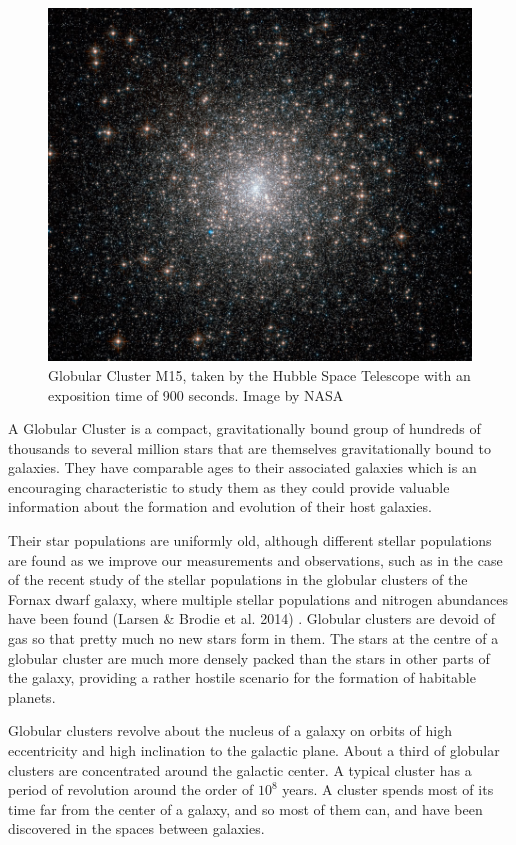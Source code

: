 \begin{figure}[H]
\centering
\includegraphics[width=12cm]{images/m15.jpg}
\caption[M15 Globular cluster]{Globular Cluster M15, taken by the Hubble Space Telescope with an exposition time of 900 seconds. Image by NASA}
\end{figure}

A Globular Cluster is a compact, gravitationally bound group of hundreds of thousands to several million stars that are themselves gravitationally bound to galaxies. They have comparable ages to their associated galaxies which is an encouraging characteristic to study them as they could provide valuable information about the formation and evolution of their host galaxies.

Their star populations are uniformly old, although different stellar populations are found as we improve our measurements and observations, such as in the case of the recent study of the stellar populations in the globular clusters of the Fornax dwarf galaxy, where multiple stellar populations and nitrogen abundances have been found (Larsen \& Brodie et al. 2014) \cite{15}. Globular clusters are devoid of gas so that pretty much no new stars form in them. The stars at the centre of a globular cluster are much more densely packed than the stars in other parts of the galaxy, providing a rather hostile scenario for the formation of habitable planets.

Globular clusters revolve about the nucleus of a galaxy on orbits of high eccentricity and high inclination to the galactic plane. About a third of globular clusters are concentrated around the galactic center. A typical cluster has a period of revolution around the order of $ 10^{8} $ years. A cluster spends most of its time far from the center of a galaxy, and so most of them can, and have been discovered in the spaces between galaxies. 

